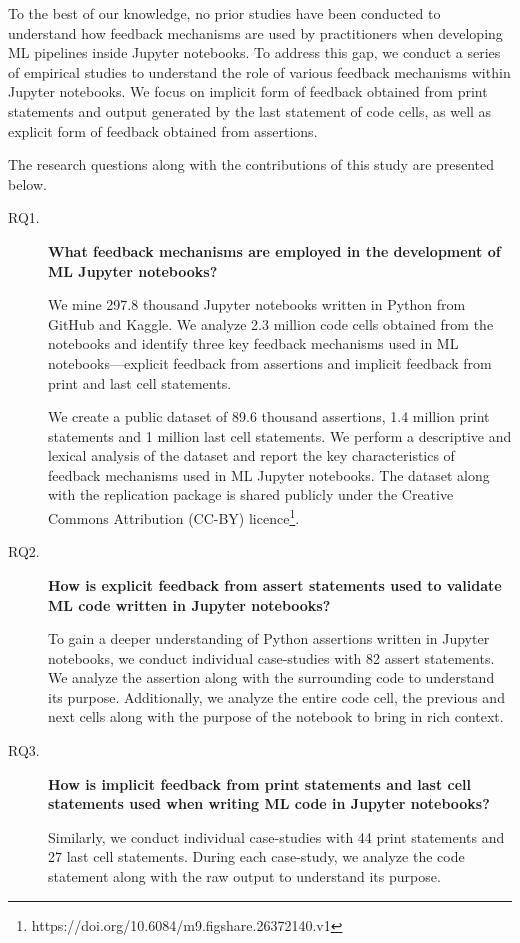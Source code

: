 \documentclass[journal]{IEEEtran}       %
\begin{document}
To the best of our knowledge, no prior studies have been conducted to
understand how feedback mechanisms are used by practitioners when
developing ML pipelines inside Jupyter notebooks. To address this
gap, we conduct a series of empirical studies to understand the role
of various feedback mechanisms within Jupyter notebooks. We focus on
implicit form of feedback obtained from print statements and output
generated by the last statement of code cells, as well as explicit
form of feedback obtained from assertions.

The research questions along with the contributions of this study are
presented below.

\begin{description}
  \item[RQ1.] \textbf{What feedback mechanisms are employed in the
    development of ML Jupyter notebooks?}

    We mine 297.8 thousand Jupyter notebooks written in Python from
    GitHub and Kaggle. We analyze 2.3 million code cells obtained
    from the notebooks and identify three key feedback mechanisms
    used in ML notebooks---explicit feedback from assertions and
    implicit feedback from print and last cell statements.

    We create a public dataset of 89.6 thousand assertions, 1.4
    million print statements and 1 million last cell statements. We
    perform a descriptive and lexical analysis of the dataset and
    report the key characteristics of feedback mechanisms used in ML
    Jupyter notebooks. The dataset along with the replication package
    is shared publicly under the Creative Commons Attribution (CC-BY)
    licence\footnote{https://doi.org/10.6084/m9.figshare.26372140.v1}.

  \item[RQ2.] \textbf{How is explicit feedback from assert statements
    used to validate ML code written in Jupyter notebooks?}

    To gain a deeper understanding of Python assertions written in
    Jupyter notebooks, we conduct individual case-studies with 82
    assert statements. We analyze the assertion along with the
    surrounding code to understand its purpose. Additionally, we
    analyze the entire code cell, the previous and next cells along
    with the purpose of the notebook to bring in rich context.

  \item[RQ3.] \textbf{How is implicit feedback from print statements
    and last cell statements used when writing ML code in Jupyter notebooks?}

    Similarly, we conduct individual case-studies with 44 print
    statements and 27 last cell statements. During each case-study,
    we analyze the code statement along with the raw output to
    understand its purpose.
\end{description}
\end{document}
